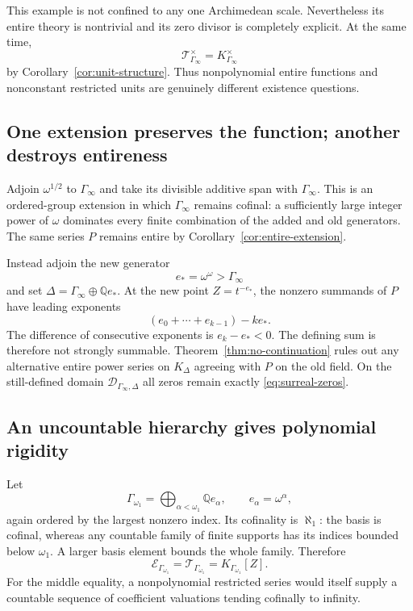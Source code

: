 \documentclass[11pt,letterpaper]{article}
\numberwithin{equation}{section}
\theoremstyle{definition}
\theoremstyle{remark}
\newcommand{\Q}{\mathbb Q}
\begin{document}
This example is not confined to any one Archimedean scale. Nevertheless its
entire theory is nontrivial and its zero divisor is completely explicit.
At the same time,
\[
 \mathcal T_{\Gamma_\infty}^{\times}=K_{\Gamma_\infty}^{\times}
\]
by Corollary~\ref{cor:unit-structure}. Thus nonpolynomial entire functions and
nonconstant restricted units are genuinely different existence questions.

\subsection{One extension preserves the function; another destroys entireness}
Adjoin $\omega^{1/2}$ to $\Gamma_\infty$ and take its divisible additive span
with $\Gamma_\infty$. This is an ordered-group extension in which
$\Gamma_\infty$ remains cofinal: a sufficiently large integer power of
$\omega$ dominates every finite combination of the added and old generators.
The same series $P$ remains entire by Corollary~\ref{cor:entire-extension}.

Instead adjoin the new generator
\[
 e_*=\omega^\omega>\Gamma_\infty
\]
and set $\Delta=\Gamma_\infty\oplus\Q e_*$. At the new point
$Z=t^{-e_*}$, the nonzero summands of $P$ have leading exponents
\[
 (e_0+\cdots+e_{k-1})-ke_*.
\]
The difference of consecutive exponents is $e_k-e_*<0$. The defining sum is
therefore not strongly summable. Theorem~\ref{thm:no-continuation} rules out
any alternative entire power series on $K_\Delta$ agreeing with $P$ on the
old field. On the still-defined domain
$\mathcal D_{\Gamma_\infty,\Delta}$ all zeros remain exactly
\eqref{eq:surreal-zeros}.

\subsection{An uncountable hierarchy gives polynomial rigidity}
Let
\begin{equation}\label{eq:Gamma-omegaone}
 \Gamma_{\omega_1}=\bigoplus_{\alpha<\omega_1}\Q e_\alpha,
 \qquad e_\alpha=\omega^\alpha,
\end{equation}
again ordered by the largest nonzero index. Its cofinality is $\aleph_1$:
the basis is cofinal, whereas any countable family of finite supports has its
indices bounded below $\omega_1$. A larger basis element bounds the whole
family. Therefore
\begin{equation}\label{eq:uncountable-rigidity}
 \mathcal E_{\Gamma_{\omega_1}}
 =\mathcal T_{\Gamma_{\omega_1}}
 =K_{\Gamma_{\omega_1}}[Z].
\end{equation}
For the middle equality, a nonpolynomial restricted series would itself supply
a countable sequence of coefficient valuations tending cofinally to infinity.
\end{document}
